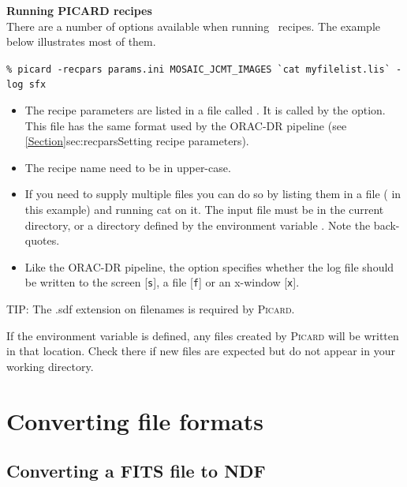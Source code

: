 \documentclass[11pt,oneside,chapters]{starlink}
\begin{document}
\textbf{Running PICARD recipes}\\
There are a number of options available when running \picard\ recipes.
The example below illustrates most of them.
\begin{terminalv}
\texttt{\% picard -recpars params.ini MOSAIC\_JCMT\_IMAGES \`{}cat myfilelist.lis\`{} -log sfx}
\end{terminalv}

\begin{itemize}
\item The recipe parameters are listed in a file called .
It is called by the  option. This file has the same
 format used by the ORAC-DR pipeline (see
\cref{Section}{sec:recpars}{Setting recipe parameters}).
\item The recipe name need to be in upper-case.
\item If you need to supply multiple files you can do so by listing
them in a file ( in this example) and running cat on it.
The input file must be in the current directory, or a directory
defined by the environment variable . Note the
back-quotes.
\item Like the ORAC-DR pipeline, the  option specifies
whether the log file should be written to the screen [\texttt{s}], a
file [\texttt{f}] or an x-window [\texttt{x}].
\end{itemize}

\begin{tip}
TIP: The .sdf extension on filenames is required by \textsc{Picard}.
\end{tip}

\begin{tip}
If the environment variable  is defined, any files
created by \textsc{Picard} will be written in that location. Check there if new
files are expected but do not appear in your working directory.
\end{tip}

\newpage
\chapter{Converting file formats}
\label{app:convert}

\section{Converting a FITS file to NDF}
\end{document}

